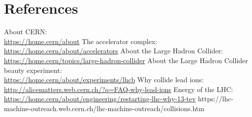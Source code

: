 \documentclass[12pt]{article}
\begin{document}
	
	\section{References}
	
	\begin{thebibliography}{asd}
		 About CERN: \\
			\url{https://home.cern/about}
		 The accelerator complex: \\
			\url{https://home.cern/about/accelerators}
		 About the Large Hadron Collider: \\
			\url{https://home.cern/topics/large-hadron-collider}
		 About the Large Hadron Collider beauty experiment: \\
			\url{https://home.cern/about/experiments/lhcb}
		 Why collide lead ions: \\
			\url{http://alicematters.web.cern.ch/?q=FAQ-why-lead-ions}
		 Energy of the LHC: \\
			\url{https://home.cern/about/engineering/restarting-lhc-why-13-tev}
		 https://lhc-machine-outreach.web.cern.ch/lhc-machine-outreach/collisions.htm
	\end{thebibliography}
\end{document}
